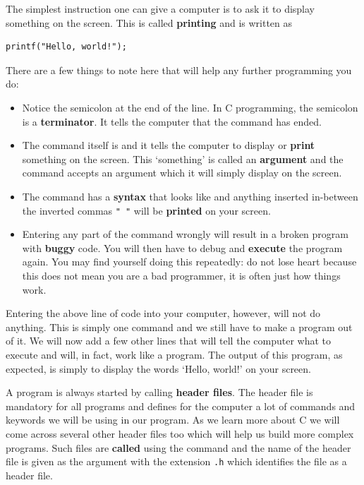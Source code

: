 \documentclass[11pt,oneside]{article}
\begin{document}
The simplest instruction one can give a computer is to ask it to display something on the screen. This is called \textbf{printing} and is written as

\begin{lstlisting}
printf("Hello, world!");
\end{lstlisting}

There are a few things to note here that will help any further programming you do:\vspace{-0.25cm}
\begin{itemize}
\itemsep-0.35em
\renewcommand\labelitemi{---}
\item Notice the semicolon \cbox{;} at the end of the line. In C programming, the semicolon is a \textbf{terminator}. It tells the computer that the command has ended.
\item The command itself is  and it tells the computer to display or \textbf{print} something on the screen. This `something' is called an \textbf{argument} and the  command accepts an argument which it will simply display on the screen.
\item The  command has a \textbf{syntax} that looks like  and anything inserted in-between the inverted commas \verb+" "+ will be \textbf{printed} on your screen.
\item Entering any part of the command wrongly will result in a broken program with \textbf{buggy} code. You will then have to debug and \textbf{execute} the program again. You may find yourself doing this repeatedly: do not lose heart because this does not mean you are a bad programmer, it is often just how things work.
\end{itemize}\vspace{-0.3cm}

Entering the above line of code into your computer, however, will not do anything. This is simply one command and we still have to make a program out of it. We will now add a few other lines that will tell the computer what to execute and will, in fact, work like a program. The output of this program, as expected, is simply to display the words `Hello, world!' on your screen.

A program is always started by calling \textbf{header files}. The  header file is mandatory for all programs and defines for the computer a lot of commands and keywords we will be using in our program. As we learn more about C we will come across several other header files too which will help us build more complex programs. Such files are \textbf{called}\label{cmd:include} using the  command and the name of the header file is given as the argument with the extension \verb+.h+ which identifies the file as a header file.\\
\end{document}
